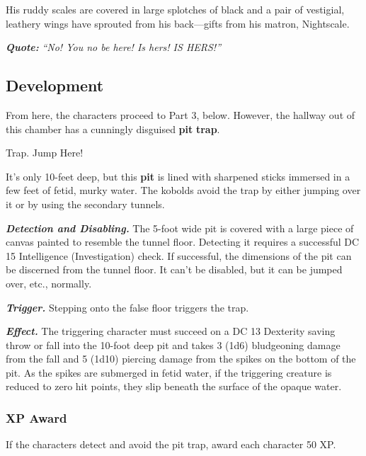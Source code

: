 His ruddy scales are covered in large splotches of black and a pair of
vestigial, leathery wings have sprouted from his back---gifts from his
matron, Nightscale.

\emph{\textbf{Quote:}} \emph{``No! You no be here! Is hers! IS HERS!''}

\subsection{Development}\label{development-1}

From here, the characters proceed to Part 3, below. However, the hallway
out of this chamber has a cunningly disguised \textbf{pit}
\textbf{trap}.

Trap. Jump Here!

It's only 10-feet deep, but this \textbf{pit} is lined with sharpened
sticks immersed in a few feet of fetid, murky water. The kobolds avoid
the trap by either jumping over it or by using the secondary tunnels.

\emph{\textbf{Detection and Disabling.}} The 5-foot wide pit is covered
with a large piece of canvas painted to resemble the tunnel floor.
Detecting it requires a successful DC 15 Intelligence (Investigation)
check. If successful, the dimensions of the pit can be discerned from
the tunnel floor. It can't be disabled, but it can be jumped over, etc.,
normally.

\emph{\textbf{Trigger.}} Stepping onto the false floor triggers the
trap.

\emph{\textbf{Effect.}} The triggering character must succeed on a DC 13
Dexterity saving throw or fall into the 10-foot deep pit and takes 3
(1d6) bludgeoning damage from the fall and 5 (1d10) piercing damage from
the spikes on the bottom of the pit. As the spikes are submerged in
fetid water, if the triggering creature is reduced to zero hit points,
they slip beneath the surface of the opaque water.

\subsubsection{XP Award}\label{xp-award}

If the characters detect and avoid the pit trap, award each character 50
XP.

\section{\texorpdfstring{\\
}{ }}\label{section-3}

